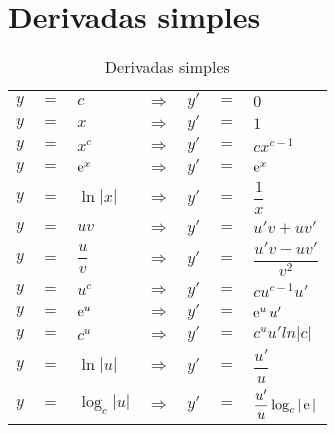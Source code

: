 \section{Derivadas simples}
	\begin{table}[htb]
		\caption{Derivadas simples}
		\label{derivadas_simples}
		\centering
		\begin{tabular}{|lclclcl|}
			$y$ & $=$ & $c$            & $\Rightarrow$ & $y'$ & $=$ & $0$                       \\
			$y$ & $=$ & $x$            & $\Rightarrow$ & $y'$ & $=$ & $1$                       \\
			$y$ & $=$ & $x^c$          & $\Rightarrow$ & $y'$ & $=$ & $cx^{c - 1}$              \\
			$y$ & $=$ & $\operatorname{e}^x$         & $\Rightarrow$ & $y'$ & $=$ & $\operatorname{e}^x$                    \\
			$y$ & $=$ & $\ln |x|$      & $\Rightarrow$ & $y'$ & $=$ & $\dfrac{1}{x}$            \\
			$y$ & $=$ & $uv$           & $\Rightarrow$ & $y'$ & $=$ & $u'v + uv'$               \\
			$y$ & $=$ & $\dfrac{u}{v}$ & $\Rightarrow$ & $y'$ & $=$ & $\dfrac{u'v - uv'}{v^2}$  \\
			$y$ & $=$ & $u^c$          & $\Rightarrow$ & $y'$ & $=$ & $cu^{c - 1}u'$            \\
			$y$ & $=$ & $\operatorname{e}^u$         & $\Rightarrow$ & $y'$ & $=$ & $\operatorname{e}^uu'$                  \\
			$y$ & $=$ & $c^u$          & $\Rightarrow$ & $y'$ & $=$ & $c^uu'ln|c|$              \\
			$y$ & $=$ & $\ln |u|$      & $\Rightarrow$ & $y'$ & $=$ & $\dfrac{u'}{u}$           \\
			$y$ & $=$ & $\log_c|u|$    & $\Rightarrow$ & $y'$ & $=$ & $\dfrac{u'}{u}\log_c|\operatorname{e}|$
		\end{tabular}		
	\end{table}

